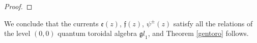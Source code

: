 \begin{proof}
\end{proof}
We conclude that the currents ${\mathfrak e}(z)$, ${\mathfrak f}(z)$, $\psi^\pm(z)$ satisfy all the relations of the
level $(0,0)$ quantum toroidal algebra ${\mathfrak gl}_1$, and Theorem \ref{gentoro} follows.



